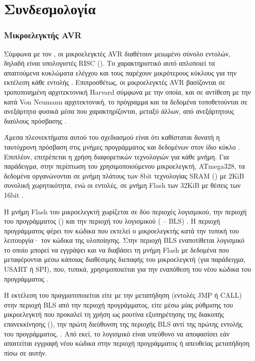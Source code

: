 \chapter{Συνδεσμολογία}

\subsection{Μικροελεγκτής AVR}

Σύμφωνα με τον \textcite[1]{myklebust97}, οι μικροελεγκτές AVR διαθέτουν
μειωμένο σύνολο εντολών, δηλαδή είναι υπολογιστές RISC (). Το χαρακτηριστικό αυτό απλοποιεί τα απαιτούμενα κυκλώματα
ελέγχου και τους παρέχουν μικρότερους κύκλους για την εκτέλεση κάθε εντολής
\parencite[1]{sequin82}. Επιπροσθέτως, οι μικροελεγκτές AVR βασίζονται σε
τροποποιημένη αρχιτεκτονική Harvard σύμφωνα με την οποία, και σε αντίθεση με την
κατά Von Neumann αρχιτεκτονική, το πρόγραμμα και τα δεδομένα τοποθετούνται σε
ανεξάρτητα φυσικά μέσα που χαρακτηρίζονται, μεταξύ άλλων, από ανεξάρτητους
διαύλους πρόσβασης \parencite[1]{myklebust97}.

Άμεσα πλεονεκτήματα αυτού του σχεδιασμού είναι ότι καθίσταται δυνατή η
ταυτόχρονη πρόσβαση στις μνήμες προγράμματος και δεδομένων στον ίδιο κύκλο
\parencite[8]{atmel13}. Επιπλέον, επιτρέπεται η χρήση διαφορετικών τεχνολογιών
για κάθε μνήμη. Για παράδειγμα, στην περίπτωση του χρησιμοποιούμενου
μικροελεγκτή, ATmega328, τα δεδομένα οργανώνονται σε μνήμη πλάτους των 8bit
τεχνολογίας SRAM () με 2KiB συνολική χωρητικότητα, ενώ οι
εντολές, σε μνήμη Flash των 32KiB με θέσεις των 16bit
\parencite[8--9,16,18]{atmel13}.


Η μνήμη Flash του μικροελεγκτή χωρίζεται σε δύο περιοχές λογισμικού, την περιοχή
του προγράμματος () και την περιοχή του λογισμικού
 ( -- BLS) \parencite[269]{atmel13}.
Η περιοχή προγράμματος φέρει τον κώδικα που εκτελεί ο μικροελεγκτής κατά την
τυπική του λειτουργία· τον κώδικα της υλοποίησης. Στην περιοχή BLS εναποτίθεται
λογισμικό το οποίο μπορεί να εγγράψει και να διαβάσει τη μνήμη Flash με δεδομένα
που μεταφέρονται μέσω κάποιας διαθέσιμης διεπαφής του μικροελεγκτή (για
παράδειγμα, USART ή SPI), που, τυπικά, χρησιμοποιείται για την εναπόθεση του
νέου κώδικα του προγράμματος \parencite[269,273]{atmel13}.

Η εκτέλεση του  πραγματοποιείται είτε με την μεταπήδηση (εντολές
JMP ή CALL) στην περιοχή BLS από την περιοχή προγράμματος, είτε μέσω μίας
ρύθμισης του μικροελεγκτή που προκαλεί τη χρήση ως ρουτίνα εξυπηρέτησης της
διακοπής επανεκκίνησης (), την πρώτη διεύθυνση της περιοχής BLS αντί
της πρώτης εντολής του προγράμματος, \parencite[273]{atmel13}. Από εκεί, το
λογισμικό  είναι υπεύθυνο να αποφασίσει εάν απαιτείται εγγραφή
νέου κώδικα στην περιοχή προγράμματος ή απευθείας μεταπήδηση πίσω σε αυτήν.


